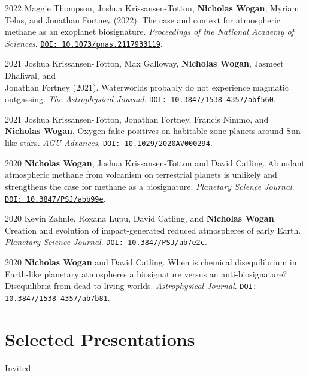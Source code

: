 \documentclass[12pt]{article}
\begin{document}
\begin{cvlist}
\item[2022]
  Maggie Thompson, Joshua Krissansen-Totton, \textbf{Nicholas Wogan}, Myriam Telus, and Jonathan Fortney (2022). The case and context for atmospheric methane as an exoplanet biosignature. \emph{Proceedings of the National Academy of Sciences}. \href{https://doi.org/10.1073/pnas.2117933119}{\nolinkurl{DOI: 10.1073/pnas.2117933119}}.
\item[2021]
  Joshua Krissansen-Totton, Max Galloway, \textbf{Nicholas Wogan}, Jasmeet Dhaliwal, and \\Jonathan Fortney (2021). Waterworlds probably do not experience magmatic outgassing. \emph{The Astrophysical Journal}. \href{https://doi.org/10.3847/1538-4357/abf560}{\nolinkurl{DOI: 10.3847/1538-4357/abf560}}.
\item[2021]
  Joshua Krissansen-Totton, Jonathan Fortney, Francis Nimmo, and \textbf{Nicholas Wogan}. Oxygen false positives on habitable zone planets around Sun-like stars. \emph{AGU Advances}. \href{https://doi.org/10.1029/2020AV000294}{\nolinkurl{DOI: 10.1029/2020AV000294}}.
\item[2020]
  \textbf{Nicholas Wogan}, Joshua Krissansen-Totton and David Catling. Abundant atmospheric methane from volcanism on terrestrial planets is unlikely and strengthens the case for methane as a biosignature. \emph{Planetary Science Journal}. \href{https://doi.org/10.3847/PSJ/abb99e}{\nolinkurl{DOI: 10.3847/PSJ/abb99e}}.
\item[2020]
  Kevin Zahnle, Roxana Lupu, David Catling, and \textbf{Nicholas Wogan}. Creation and evolution of impact-generated reduced atmospheres of early Earth. \emph{Planetary Science Journal}. \href{https://doi.org/10.3847/PSJ/ab7e2c}{\nolinkurl{DOI: 10.3847/PSJ/ab7e2c}}.
\item[2020]
  \textbf{Nicholas Wogan} and David Catling. When is chemical disequilibrium in Earth-like planetary atmospheres a biosignature versus an anti-biosignature? Disequilibria from dead to living worlds. \emph{Astrophysical Journal}. \href{https://doi.org/10.3847/1538-4357/ab7b81}{\nolinkurl{DOI: 10.3847/1538-4357/ab7b81}}.
\end{cvlist}

\section{Selected Presentations}

\noindent Invited
\end{document}
